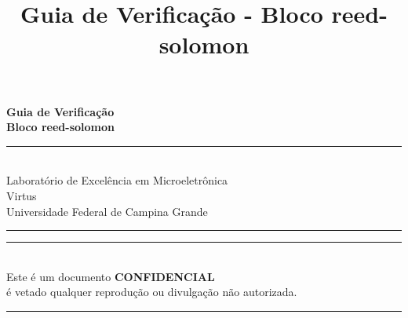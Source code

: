 \documentclass[a4paper]{article}
\begin{document}
\begin{titlepage}
{{                \textbf{Guia de Verificação \\
                Bloco reed-solomon}
                
                \vspace{0.7cm} %
            }
        }
    
    \vfill %
    
    
    \parbox[t]{0.93\textwidth}{ %
    
        \raggedleft %
        \hfill\rule{0.2\linewidth}{1pt} \\[4pt]%
        \large %
        {\Large Laboratório de Excelência em Microeletrônica}\\[4pt] %
        Virtus\\
        Universidade Federal de Campina Grande\\[4pt] %

        \hfill\rule{0.2\linewidth}{1pt}%
    }
    
\end{titlepage}

\title{Guia de Verificação - Bloco reed-solomon}


    
\pagebreak
\hspace{0pt}
\vfill
\begin{center}
\hfill\rule{\linewidth}{1pt} \\[4pt]
    Este é um documento \textbf{CONFIDENCIAL} \\
    é vetado qualquer reprodução ou divulgação não autorizada.\\[4pt]
    \hfill\rule{\linewidth}{1pt} \\[4pt]
\end{center}
\vfill
\hspace{0pt}
\pagebreak

\end{document}
